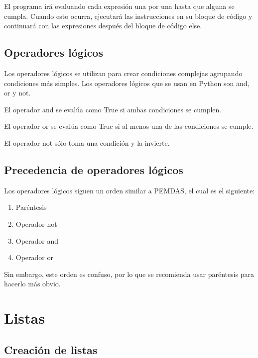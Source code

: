 \documentclass{report}
\begin{document}
El programa irá evaluando cada expresión una por una hasta que alguna se cumpla. Cuando esto ocurra, ejecutará las instrucciones en su bloque de código y continuará con las expresiones después del bloque de código else.

\section{Operadores lógicos}

Los operadores lógicos se utilizan para crear condiciones complejas agrupando condiciones más simples. Los operadores lógicos que se usan en Python son and, or y not.

El operador and se evalúa como True si ambas condiciones se cumplen.


El operador or se evalúa como True si al menos una de las condiciones se cumple.


El operador not sólo toma una condición y la invierte.


\section{Precedencia de operadores lógicos}

Los operadores lógicos siguen un orden similar a PEMDAS, el cual es el siguiente:

\begin{enumerate}
  \item Paréntesis
  \item Operador not
  \item Operador and
  \item Operador or
\end{enumerate}

Sin embargo, este orden es confuso, por lo que se recomienda usar paréntesis para hacerlo más obvio.


\clearpage\chapter{Listas}

\section{Creación de listas}
\end{document}
